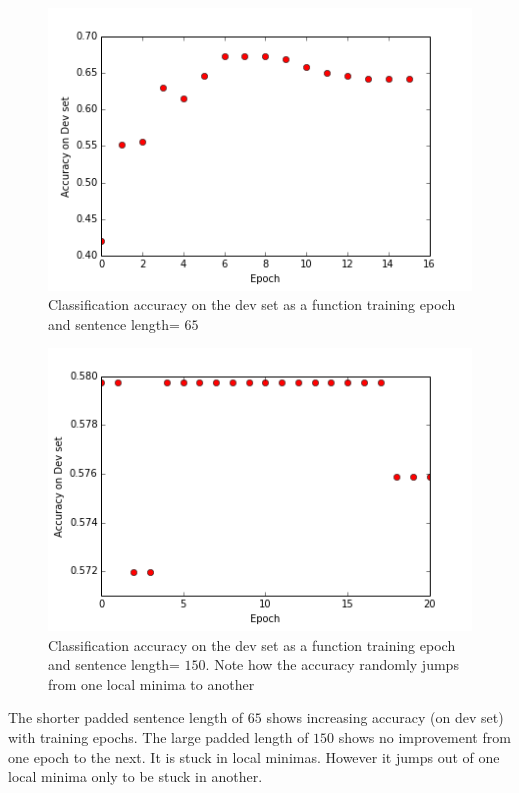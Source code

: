 \documentclass{article} %
\begin{document}
\begin{figure}[h]
\begin{center}
\includegraphics[width = 0.8\linewidth]{dev_accuracy_65.png}
\end{center}
\caption{Classification accuracy on the dev set as a function training epoch and sentence length= $65$}
\end{figure}

\begin{figure}[h]
\begin{center}
\includegraphics[width = 0.8\linewidth]{dev_accuracy_150.png}
\end{center}
\caption{Classification accuracy on the dev set as a function training epoch and sentence length= $150$. Note how the accuracy randomly jumps from one local minima to another}
\end{figure}


The shorter padded sentence length of $65$ shows increasing accuracy (on dev set) with training epochs. The large padded length of $150$ shows no improvement from one epoch to the next. It is stuck in local minimas. However it jumps out of one local minima only to be stuck in another.
\end{document}

